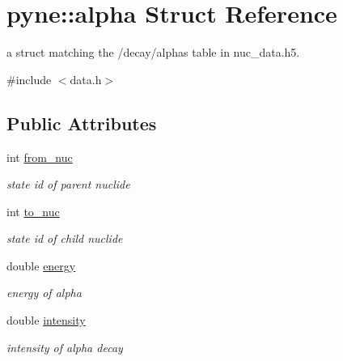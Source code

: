 \hypertarget{structpyne_1_1alpha}{}\section{pyne\+:\+:alpha Struct Reference}
\label{structpyne_1_1alpha}


a struct matching the \textquotesingle{}/decay/alphas\textquotesingle{} table in nuc\+\_\+data.\+h5.  




{\ttfamily \#include $<$data.\+h$>$}

\subsection*{Public Attributes}
\begin{DoxyCompactItemize}
\item 
int \hyperlink{structpyne_1_1alpha_af41fd4e97378d30f3fbc9f01999b2d2a}{from\+\_\+nuc}\hypertarget{structpyne_1_1alpha_af41fd4e97378d30f3fbc9f01999b2d2a}{}\label{structpyne_1_1alpha_af41fd4e97378d30f3fbc9f01999b2d2a}

\begin{DoxyCompactList}\small\item\em state id of parent nuclide \end{DoxyCompactList}\item 
int \hyperlink{structpyne_1_1alpha_ab099ce46072d7022caf1a49de2e0974b}{to\+\_\+nuc}\hypertarget{structpyne_1_1alpha_ab099ce46072d7022caf1a49de2e0974b}{}\label{structpyne_1_1alpha_ab099ce46072d7022caf1a49de2e0974b}

\begin{DoxyCompactList}\small\item\em state id of child nuclide \end{DoxyCompactList}\item 
double \hyperlink{structpyne_1_1alpha_a5f1aa6a1d0e8c02a0967ee160e35fdb2}{energy}\hypertarget{structpyne_1_1alpha_a5f1aa6a1d0e8c02a0967ee160e35fdb2}{}\label{structpyne_1_1alpha_a5f1aa6a1d0e8c02a0967ee160e35fdb2}

\begin{DoxyCompactList}\small\item\em energy of alpha \end{DoxyCompactList}\item 
double \hyperlink{structpyne_1_1alpha_a56e40c800fbe36f1d62113ddf4c162e7}{intensity}\hypertarget{structpyne_1_1alpha_a56e40c800fbe36f1d62113ddf4c162e7}{}\label{structpyne_1_1alpha_a56e40c800fbe36f1d62113ddf4c162e7}

\begin{DoxyCompactList}\small\item\em intensity of alpha decay \end{DoxyCompactList}\end{DoxyCompactItemize}


